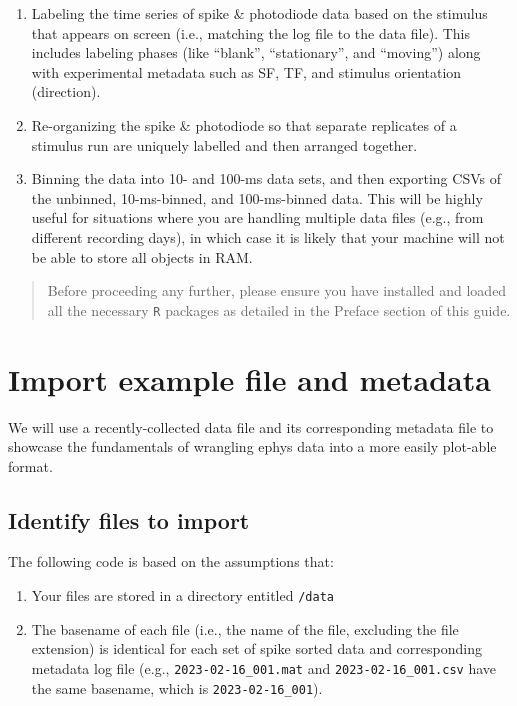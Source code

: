 \documentclass[
]{book}
\begin{document}
\begin{enumerate}
\def\labelenumi{\arabic{enumi})}
\item
  Labeling the time series of spike \& photodiode data based on the
  stimulus that appears on screen (i.e., matching the log file to
  the data file). This includes labeling phases (like ``blank'',
  ``stationary'', and ``moving'') along with experimental metadata such
  as SF, TF, and stimulus orientation (direction).
\item
  Re-organizing the spike \& photodiode so that separate replicates
  of a stimulus run are uniquely labelled and then arranged
  together.
\item
  Binning the data into 10- and 100-ms data sets, and then exporting
  CSVs of the unbinned, 10-ms-binned, and 100-ms-binned data. This
  will be highly useful for situations where you are handling
  multiple data files (e.g., from different recording days), in
  which case it is likely that your machine will not be able to
  store all objects in RAM.
\end{enumerate}

\begin{quote}
Before proceeding any further, please ensure you have installed and
loaded all the necessary \texttt{R} packages as detailed in the Preface
section of this guide.
\end{quote}

\hypertarget{import-example-file-and-metadata}{%
\section{Import example file and metadata}\label{import-example-file-and-metadata}}

We will use a recently-collected data file and its corresponding
metadata file to showcase the fundamentals of wrangling ephys data
into a more easily plot-able format.

\hypertarget{identify-files-to-import}{%
\subsection{Identify files to import}\label{identify-files-to-import}}

The following code is based on the assumptions that:

\begin{enumerate}
\def\labelenumi{\arabic{enumi})}
\item
  Your files are stored in a directory entitled \texttt{/data}
\item
  The basename of each file (i.e., the name of the file, excluding the file
  extension) is identical for each set of spike sorted data and corresponding
  metadata log file (e.g., \texttt{2023-02-16\_001.mat} and \texttt{2023-02-16\_001.csv} have the
  same basename, which is \texttt{2023-02-16\_001}).
\end{enumerate}
\end{document}
